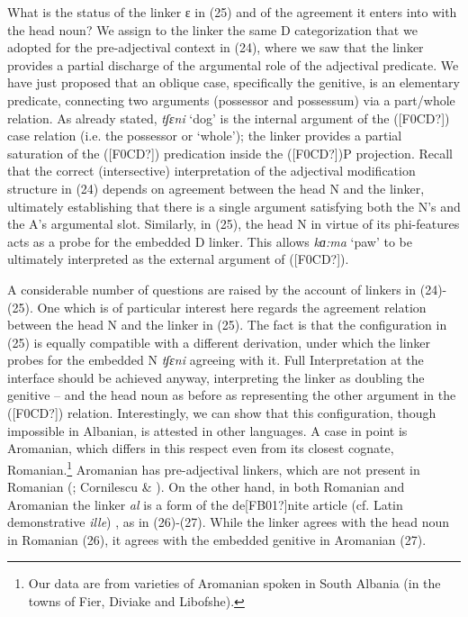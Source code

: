 \documentclass[output=paper]{langsci/langscibook}
\begin{document}
 
\begin{styleGrigliamediaiiColorexi}
What is the status of the linker ɛ in (25) and of the agreement it enters into with the head noun? We assign to the linker the same D categorization that we adopted for the pre-adjectival context in (24), where we saw that the linker provides a partial discharge of the argumental role of the adjectival predicate. We have just proposed that an oblique case, specifically the genitive, is an elementary predicate, connecting two arguments (possessor and possessum) via a part/whole relation. As already stated, \textit{tʃ}\textit{ɛni} ‘dog’ is the internal argument of the ([F0CD?]) case relation (i.e. the possessor or ‘whole’); the linker provides a partial saturation of the ([F0CD?]) predication inside the ([F0CD?])P projection. Recall that the correct (intersective) interpretation of the adjectival modification structure in (24) depends on agreement between the head N and the linker, ultimately establishing that there is a single argument satisfying both the N’s and the A’s argumental slot. Similarly, in (25), the head N in virtue of its phi-features acts as a probe for the embedded D linker. This allows \textit{kɑ}\textit{:ma} ‘paw’ to be ultimately interpreted as the external argument of ([F0CD?]).
\end{styleGrigliamediaiiColorexi}

\begin{styleGrigliamediaiiColorexi}
A considerable number of questions are raised by the account of linkers in (24)-(25). One which is of particular interest here regards the agreement relation between the head N and the linker in (25). The fact is that the configuration in (25) is equally compatible with a different derivation, under which the linker probes for the embedded N \textit{tʃ}\textit{ɛni} agreeing with it. Full Interpretation at the interface should be achieved anyway, interpreting the linker as doubling the genitive – and the head noun as before as representing the other argument in the ([F0CD?]) relation. Interestingly, we can show that this configuration, though impossible in Albanian, is attested in other languages. A case in point is Aromanian, which differs in this respect even from its closest cognate, Romanian.\footnote{Our data are from varieties of Aromanian spoken in South Albania (in the towns of Fier, Diviake and Libofshe).} Aromanian has pre-adjectival linkers, which are not present in Romanian (\citealt{Campos2008}; Cornilescu \& \citealt{Giurgea2013}). On the other hand, in both Romanian and Aromanian the linker \textit{al} is a form of the de[FB01?]nite article (cf. Latin demonstrative \textit{ille}) \citep{Giurgea2012}, as in (26)-(27). While the linker agrees with the head noun in Romanian (26), it agrees with the embedded genitive in Aromanian (27).
\end{styleGrigliamediaiiColorexi}
\end{document}
